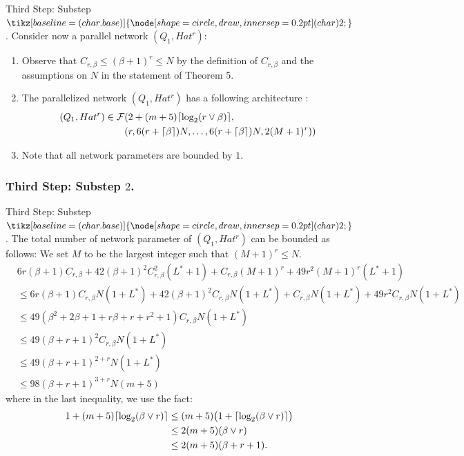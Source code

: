\documentclass{if-beamer}
\DeclarePairedDelimiter{\ceil}{\lceil}{\rceil}
\newcommand*\circled[1]{\tikz[baseline=(char.base)]{
            \node[shape=circle,draw,inner sep=0.2pt] (char) {#1};}}
\begin{document}
\begin{frame}{Third Step: Substep $\circled{2}$.}
Consider now a parallel network $(Q_{1},Hat^{r})$:
\begin{enumerate}
    \item Observe that $C_{r,\beta} \leq (\beta+1)^{r} \leq N$ by the definition of $C_{r,\beta}$ and the assumptions on $N$ in the statement of Theorem 5. 
    \item The parallelized network $(Q_{1},Hat^{r})$ has a following architecture :
    \begin{align*}
        (Q_{1},Hat^{r}) \in \mathcal{F}&(2+(m+5) \ceil{\log_{2}(r \vee \beta)},\\
            &(r,6(r+\ceil{\beta})N,\dots,6(r+\ceil{\beta})N,2(M+1)^{r}))
    \end{align*}
    \item Note that all network parameters are bounded by $1$.
\end{enumerate}

\end{frame}

\subsubsection{Third Step: Substep $2$.}
\begin{frame}{Third Step: Substep $\circled{2}$.}
The total number of network parameter of $(Q_{1}, Hat^{r})$ can be bounded as follows:
We set $M$ to be the largest integer such that $(M+1)^{r} \leq N$.
    \begin{align*}
        &6r(\beta+1)C_{r,\beta} +42(\beta+1)^{2}C_{r,\beta}^{2}(L^*+1) + C_{r,\beta}(M+1)^{r} + 49r^{2}(M+1)^{r}(L^*+1) \\
        &\leq 6r(\beta+1)C_{r,\beta}N(1+L^*) + 42(\beta+1)^{2}C_{r,\beta}N(1+L^*)  + C_{r,\beta}N(1+L^*) + 49r^{2}C_{r,\beta}N(1+L^*)\\
        &\leq 49(\beta^{2}+2\beta+1+r\beta+r+r^{2}+1)C_{r,\beta}N(1+L^*)\\
        &\leq 49(\beta+r+1)^{2}C_{r,\beta}N(1+L^*)\\
        &\leq 49(\beta+r+1)^{2+r}N(1+L^*)\\
        &\leq 98(\beta+r+1)^{3+r}N(m+5)
    \end{align*}
where in the last inequality, we use the fact:
\begin{align*}
    1+(m+5)\ceil{\log_{2}(\beta \vee r)} 
    &\leq (m+5) \big( 1+\ceil{\log_{2}(\beta \vee r)}\big)\\
    &\leq 2(m+5)(\beta \vee r)\\
    &\leq 2(m+5)(\beta + r + 1).
\end{align*}
\end{frame}
\end{document}

